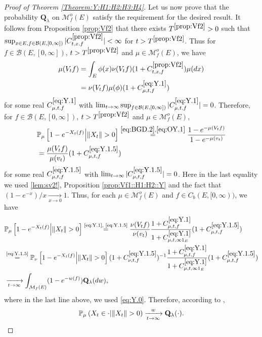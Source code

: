 \documentclass[12pt,a4paper]{amsart}
\numberwithin{equation}{section}
\theoremstyle{plain}
\theoremstyle{definition}
\theoremstyle{remark}
\begin{document}
\begin{proof}[Proof of Theorem \ref{Theorem:Y:H1:H2:H3:H4}]
	Let us now prove that the probability $\mathbf Q_\lambda$ on $\mathcal M_f^o(E)$ satisfy the requirement for the desired result. %
	It follows from Proposition \ref{prop:Vf2} that there exists $T^{\ref{prop:Vf2}}>0$ such that $\sup_{x\in E, f \in \mathcal B(E,[0,\infty])} |C^{\ref{prop:Vf2}}_{t,x,f}|< \infty$ for $t>T^{\ref{prop:Vf2}}$.
	Thus for $f \in \mathcal B(E,[0,\infty])$, $t>T^{\ref{prop:Vf2}}$ and $\mu \in \mathcal M_f^o(E)$, we have
\begin{align}
	\mu(V_tf)
	&= \int_E  \phi(x) \nu (V_tf) (1+C^{\ref{prop:Vf2}}_{t,x,f})\mu(dx)
	\\ \label{eq:Y.1} & = \nu(V_tf) \mu(\phi)(1+ C^{\eqref{eq:Y.1}}_{\mu,t,f})
\end{align}
	for some real $C^{\eqref{eq:Y.1}}_{\mu,t,f}$ with
	$\lim_{t\to \infty} \sup_{f \in \mathcal B(E,[0,\infty])}
	|C^{\eqref{eq:Y.1}}_{\mu,t,f}| = 0$.
	Therefore, for $f\in \mathcal B(E,[0,\infty])$,
	$t > T^{\ref{prop:Vf2}}$ and $\mu \in \mathcal M_f^o(E)$,
\begin{align}
	&\mathbb P_\mu \left[1 - e^{-X_t(f)} \middle|\|X_t\|>0\right]
	\overset{\eqref{eq:BGD.2},\eqref{eq:OY.1}}= \frac{1 - e^{- \mu(V_tf)}} {1 - e^{-\mu(v_t)}}
	\\\label{eq:Y.1.5}& = \frac{ \mu(V_t f) }{ \mu(v_t) } (1+C^{\eqref{eq:Y.1.5}}_{\mu,t,f})
\end{align}
	for some real $C^{\eqref{eq:Y.1.5}}_{\mu,t,f}$ with $\lim_{t\to \infty} |C^{\eqref{eq:Y.1.5}}_{\mu,t,f}| = 0$.
	Here in the last equality we used \eqref{lem:sv2!}, Proposition \ref{prop:Vf1::H1:H2::Y} and the fact that $(1-e^{-x})/x \xrightarrow[x\to 0]{}1$.
	Thus, for each $\mu \in \mathcal M^o_f(E)$ and $f\in C_b(E,[0,\infty))$, we have
\begin{align}
&\mathbb P_\mu \left[1 - e^{-X_t(f)} \middle|\|X_t\|>0\right]
	 \overset{\text{\eqref{eq:Y.1}, \eqref{eq:Y.1.5}}}= \frac{ \nu(V_tf) }{ \nu(v_t) } \frac{1+C^{\eqref{eq:Y.1}}_{\mu,t,f}}{1+C^{\eqref{eq:Y.1}}_{\mu, t,\infty 1_E}}(1+ C^{\eqref{eq:Y.1.5}}_{\mu,t,f})
	\\& \overset{\text{\eqref{eq:Y.1.5}}}= \mathbb P_\nu \left[1 - e^{-X_t(f)} \middle| \|X_t\|>0\right](1+C^{\eqref{eq:Y.1.5}}_{\nu, t,f})^{-1}  \frac{1+C^{\eqref{eq:Y.1}}_{\mu,t,f}}{1+C^{\eqref{eq:Y.1}}_{\mu,  t,\infty 1_E}}(1+ C^{\eqref{eq:Y.1.5}}_{\mu,t,f})
	\\&\xrightarrow[t\to \infty]{} \int_{\mathcal M_f(E)}(1-e^{-w(f)}) \mathbf Q_\lambda(dw),
\end{align}
	where in the last line above, we used \eqref{eq:Y.0}.
	Therefore, according to \cite[Theorem 1.18]{Li2011MeasureValued},
	\[\mathbb P_\mu\left(X_t \in \cdot \middle| \|X_t\|>0\right) 
	\xrightarrow[t\to \infty]{w} 
	\mathbf Q_\lambda(\cdot). \qedhere\]
\end{proof}
\end{document}
